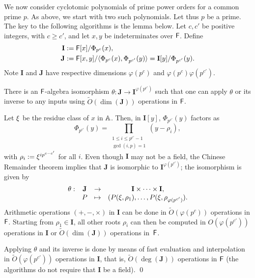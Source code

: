 We now consider cyclotomic polynomials of prime power
orders for a common prime $p$. As above, we start with two such polynomials.
Let thus $p$ be a prime. The key to the following algorithms is the
lemma below.  Let $c,c'$ be positive integers, with $c \ge
c'$, and let $x,y$ be indeterminates over ${\mathsf{F}}$. Define
\begin{align}
\mathbf{I}&:={\mathsf{F}}[x]/\Phi_{p^c}(x),  \\
\mathbf{J}&:={\mathsf{F}}[x,y]/\langle \Phi_{p^c}(x), \Phi_{p^{c'}}(y)\rangle = \mathbf{I}[y]/\Phi_{p^{c'}}(y).
\end{align}
Note $\mathbf{I}$ and $\mathbf{J}$ have respective dimensions
$\varphi(p^c)$ and $\varphi(p^c) \varphi(p^{c'})$.

\smallskipback
\begin{lemma}
  There is an ${\mathsf{F}}$-algebra isomorphism $\theta: \mathbf{J} \to
  \mathbf{I}^{\varphi(p^{c'})}$ such that one can apply $\theta$ or
  its inverse to any inputs using $\tilde{O}(\dim(\mathbf{J}))$ operations in ${\mathsf{F}}$.
\end{lemma}

\smallskipback
{}
  Let $\xi$ be the residue class of
  $x$ in $\mathbb{A}$. Then, in $\mathbf{I}[y]$, $\Phi_{p^{c'}}(y)$ factors as
  $$\Phi_{p^{c'}}(y) =\prod_{\substack{1 \le i\le p^{c'}-1\\ \gcd(i,p)
      =1}} (y-\rho_i),$$ with $\rho_i:={\xi}^{i p^{c-c'}}$ for all
  $i$.  Even though $\mathbf{I}$ may not be a field, the Chinese
  Remainder theorem implies that $\mathbf{J}$ is isomorphic to
  $\mathbf{I}^{\varphi(p^{c'})}$; the isomorphism is given by
  $$\begin{array}{cccc}
    \theta: & \mathbf{J} & \to & \mathbf{I} \times \cdots \times \mathbf{I}, \\
    & P & \mapsto& (P(\xi,\rho_1),\dots,P(\xi,\rho_{\varphi(p^{c'})}).
  \end{array}$$
  Arithmetic operations $(+,-,\times)$ in
  $\mathbf{I}$ can be done in $\tilde{O}(\varphi(p^c))$ operations
  in ${\mathsf{F}}$. Starting from $\rho_1 \in \mathbf{I}$, all other roots
  $\rho_i$ can then be computed in $O(\varphi(p^{c'}))$ operations in
  $\mathbf{I}$ or $\tilde{O}(\dim(\mathbf{J}))$
  operations in~${\mathsf{F}}$. 
  
Applying $\theta$ and its inverse is done by means of fast evaluation
and interpolation~\cite[Chapter~10]{vzGathen13} in $\tilde{O}(\varphi(p^{c'}))$
operations in $\mathbf{I}$, that is, $\tilde{O}(\deg(\mathbf{J}))$ operations in ${\mathsf{F}}$
(the algorithms do not require that $\mathbf{I}$ be a field).
\qed

